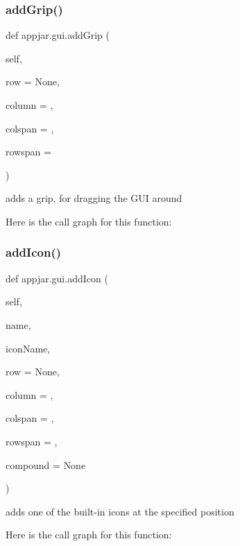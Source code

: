 \subsubsection{\texorpdfstring{add\+Grip()}{addGrip()}}
{\footnotesize\ttfamily def appjar.\+gui.\+add\+Grip (\begin{DoxyParamCaption}\item[{}]{self,  }\item[{}]{row = {\ttfamily None},  }\item[{}]{column = {},  }\item[{}]{colspan = {},  }\item[{}]{rowspan = {} }\end{DoxyParamCaption})}

\begin{DoxyVerb}adds a grip, for dragging the GUI around \end{DoxyVerb}
 Here is the call graph for this function\+:
\mbox{\label{classappjar_1_1gui_a1e90146f29426baaa5aeb116d89a5e8c}} 
\subsubsection{\texorpdfstring{add\+Icon()}{addIcon()}}
{\footnotesize\ttfamily def appjar.\+gui.\+add\+Icon (\begin{DoxyParamCaption}\item[{}]{self,  }\item[{}]{name,  }\item[{}]{icon\+Name,  }\item[{}]{row = {\ttfamily None},  }\item[{}]{column = {},  }\item[{}]{colspan = {},  }\item[{}]{rowspan = {},  }\item[{}]{compound = {\ttfamily None} }\end{DoxyParamCaption})}

\begin{DoxyVerb}adds one of the built-in  icons at the specified position \end{DoxyVerb}
 Here is the call graph for this function\+:
\mbox{\label{classappjar_1_1gui_a045d8548bf48a9838a7248ccae6b91c5}} 
